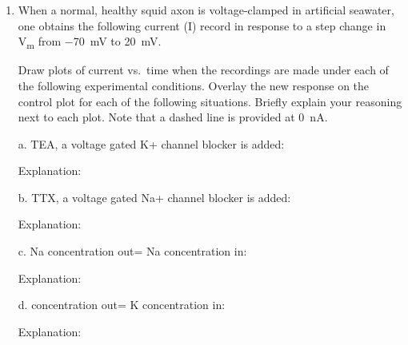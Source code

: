 \documentclass[plain,worksheet,]{inVerba-notes}
\begin{document}
\begin{enumerate}[resume]
    \item When a normal, healthy squid axon is voltage-clamped in artificial seawater, one obtains the following current (I) record in response to a step change in \si{V_m} from \SI{-70}{mV} to \SI{+20}{mV}.
    
    \bigskip
    \bigskip
    \begin{center}
        
    \end{center}

    Draw plots of current vs.\ time when the recordings are made under each of the following experimental conditions. Overlay the new response on the control plot for each of the following situations. Briefly explain your reasoning next to each plot. Note that a dashed line is provided at \SI{0}{nA}. 

    \newpage
    \item[a.] TEA, a voltage gated K+ channel blocker is added:
    
    \bigskip
    \bigskip
    \begin{center}
        
    \end{center}

    Explanation:
    \vspace{130pt}

    \item[b.] TTX, a voltage gated Na+ channel blocker is added:
    
    \bigskip
    \bigskip
    \begin{center}
        
    \end{center}
    
    Explanation:
    \vspace{130pt}

    \item[c.] Na concentration out= Na concentration in:
    
    \bigskip
    \bigskip
    \begin{center}
        
    \end{center}
    
    Explanation:
    \vspace{130pt}

    \item[d.]  concentration out= K concentration in:

    \bigskip
    \bigskip
    \begin{center}
        
    \end{center}
    
    Explanation:
    \vspace{120pt}
\end{enumerate}
\end{document}
